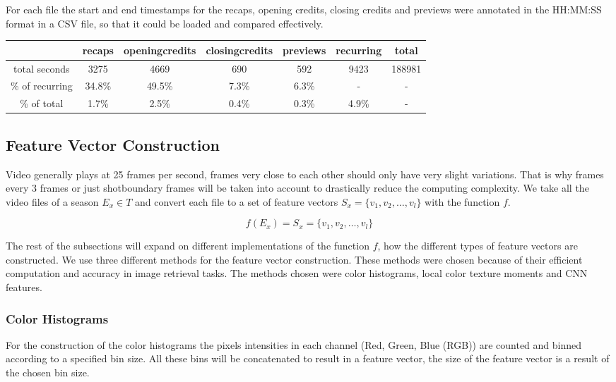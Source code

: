\documentclass{article}
\begin{document}
For each file the start and end timestamps for the recaps, opening credits, closing credits and previews were annotated in the HH:MM:SS format in a CSV file, so that it could be loaded and compared effectively.

\begin{adjustbox}{center}
	\begin{tabular}{ c | c c c c c c} 
			& recaps	& openingcredits	& closingcredits	& previews	& recurring	& total \\
		\hline
		total seconds 	& 3275	& 4669	& 690	& 592	& 9423	& 188981 \\
		\% of recurring	& 34.8\%& 49.5\%& 7.3\% & 6.3\% & -		& - \\
		\% of total 	& 1.7\%	& 2.5\%	& 0.4\%	& 0.3\%	& 4.9\%	& - \\
	\end{tabular}
\end{adjustbox}


\subsection{Feature Vector Construction}
Video generally plays at 25 frames per second, frames very close to each other should only have very slight variations. That is why frames every 3 frames or just shotboundary frames will be taken into account to drastically reduce the computing complexity. We take all the video files of a season $E_x \in T$ and convert each file to a set of feature vectors $S_x = \{v_1, v_2, \dots, v_l\}$ with the function $f$.

\[f(E_x) = S_x = \{v_1, v_2, \dots, v_l\}\]

The rest of the subsections will expand on different implementations of the function $f$, how the different types of feature vectors are constructed. We use three different methods for the feature vector construction. These methods were chosen because of their efficient computation and accuracy in image retrieval tasks. The methods chosen were color histograms, local color texture moments and CNN features.

\subsubsection{Color Histograms}
For the construction of the color histograms the pixels intensities in each channel (Red, Green, Blue (RGB)) are counted and binned according to a specified bin size. All these bins will be concatenated to result in a feature vector, the size of the feature vector is a result of the chosen bin size.
\end{document}
